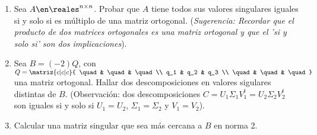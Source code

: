 \begin{enunciado}{\ejExtra} 
  \begin{enumerate}[label=\alph*)]
    \item
          Sea $A \en \reales^{n \times n}$. Probar que $A$ tiene todos sus valores singulares iguales si y solo si
          es múltiplo de una matriz ortogonal.
          (\textit{Sugerencia: Recordar que el producto de dos matrices ortogonales es una matriz ortogonal y que el 'si y solo si' son dos implicaciones}).

    \item Sea $B = (-2)Q$, con
          $Q =
            \matriz{c|c|c}{
              \quad& \quad& \quad\\
              q_1 & q_2 & q_3 \\
              \quad& \quad& \quad
            }$ una matriz ortogonal. Hallar dos descomposiciones en valores sigulares distintas de $B$.
          (Observación: dos descomposiciones
          $C =
            U_1 \Sigma_1 V_1^t =
            U_2 \Sigma_2 V_2^t
          $ son iguales si y solo si
          $U_1 = U_2$, $\Sigma_1 = \Sigma_2 $ y $ V_1 = V_2$).

    \item Calcular una matriz singular que sea más cercana a $B$ en norma 2.
  \end{enumerate}
\end{enunciado}

